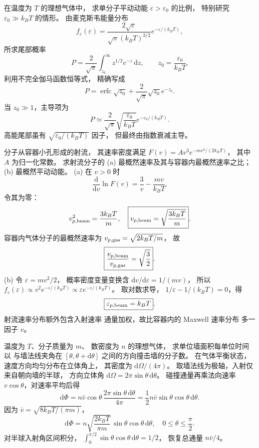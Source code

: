 在温度为 $T$ 的理想气体中，
求单分子平动动能
$\varepsilon>\varepsilon_0$ 的比例，
特别研究 $\varepsilon_0\gg k_BT$ 的情形。
\exsolution
由麦克斯韦能量分布
\[
f_\varepsilon(\varepsilon)
=\frac{2\sqrt\varepsilon}{\sqrt\pi(k_BT)^{3/2}}
e^{-\varepsilon/(k_BT)},
\]
所求尾部概率
\[
P=\frac2{\sqrt\pi}\int_{z_0}^\infty
z^{1/2}e^{-z}\,\mathrm dz,\qquad
z_0=\frac{\varepsilon_0}{k_BT}.
\]
利用不完全伽马函数恒等式，
精确写成
\[
P=\operatorname{erfc}\sqrt{z_0}
+\frac2{\sqrt\pi}\sqrt{z_0}e^{-z_0}.
\]
当 $z_0\gg1$，主导项为
\[
\boxed{P\simeq\frac2{\sqrt\pi}
\sqrt{\frac{\varepsilon_0}{k_BT}}
e^{-\varepsilon_0/(k_BT)}}.
\]
\excheck 高能尾部虽有
$\sqrt{\varepsilon_0/(k_BT)}$ 因子，
但最终由指数衰减主导。

分子从容器小孔形成的射流，
其速率密度满足
$F(v)=A v^3e^{-mv^2/(2k_BT)}$，
其中 $A$ 为归一化常数。
求射流分子的
(a) 最概然速率及其与容器内最概然速率之比；
(b) 最概然平动动能。
\exsolution
(a) 在 $v>0$ 时
\[
\frac{\mathrm d}{\mathrm dv}\ln F(v)
=\frac3v-\frac{mv}{k_BT}.
\]
令其为零：
\[
v_{p,\rm beam}^2=\frac{3k_BT}{m},
\quad
\boxed{v_{p,\rm beam}=\sqrt{\frac{3k_BT}{m}}}.
\]
容器内气体分子的最概然速率为
$v_{p,\rm gas}=\sqrt{2k_BT/m}$，
故
\[
\boxed{\frac{v_{p,\rm beam}}{v_{p,\rm gas}}
=\sqrt{\frac32}}.
\]
(b) 令 $\varepsilon=mv^2/2$，
概率密度变量变换含
$\mathrm dv/\mathrm d\varepsilon=1/(mv)$，
所以
$f_\varepsilon(\varepsilon)\propto
v^2e^{-\varepsilon/(k_BT)}
\propto\varepsilon e^{-\varepsilon/(k_BT)}$。
取对数求导，
$1/\varepsilon-1/(k_BT)=0$，得
\[
\boxed{\varepsilon_{p,\rm beam}=k_BT}.
\]
\excheck 射流速率分布额外包含入射速率
通量加权，故比容器内的 Maxwell 速率分布
多一因子 $v$。

温度为 $T$、分子质量为 $m$、
数密度为 $n$ 的理想气体，
求单位墙面积每单位时间以
与墙法线夹角在
$[\theta,\theta+\mathrm d\theta]$
之间的方向撞击墙的分子数。
\exsolution
在气体平衡状态，
速度方向均匀分布在立体角上，
其密度为 $\mathrm d\Omega/(4\pi)$。
取墙法线为极轴，入射仅来自朝向墙的半球，
方向立体角
$\mathrm d\Omega=2\pi\sin\theta\,\mathrm d\theta$。
碰撞通量再乘法向速率
$v\cos\theta$，对速率平均后得
\[
\mathrm d\Phi=
n\bar v\cos\theta\,
\frac{2\pi\sin\theta\,\mathrm d\theta}{4\pi}
=\frac12n\bar v\sin\theta\cos\theta\,\mathrm d\theta.
\]
因为
$\bar v=\sqrt{8k_BT/(\pi m)}$，
\[
\boxed{\mathrm d\Phi=
n\sqrt{\frac{2k_BT}{\pi m}}\,
\sin\theta\cos\theta\,\mathrm d\theta},
\quad 0\le\theta\le\frac\pi2.
\]
\excheck 对半球入射角区间积分，
$\int_0^{\pi/2}\sin\theta\cos\theta\,\mathrm d\theta=1/2$，
恢复总通量 $n\bar v/4$。

